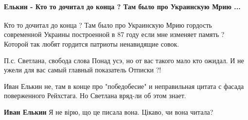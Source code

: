  
 
 
 
 
\paragraph{Елькин - Кто то дочитал до конца ? Там было про Украинскую Мрию ...}
\label{sec:14_07_2021.fb.krjukova_svetlana.1.statja_putina_mnenie.cmt.elkin_chtenie_konec}

\begin{itemize}
 

Кто то дочитал до конца ? Там было про Украинскую Мрию гордость современной
Украины построенной в 87 году если мне изменяет память ? Которой так любят
гордится патриоты ненавидящие совок. 

П.с. Светлана, свобода слова Понад усэ,
но от вас такого мало кто ожидал. И не ужели для вас самый главный показатель
Отписки ?!

 
Иван Елькин не, там в конце про "победобесие" и неправильная цитата с фасада поверженного Рейхстага. Но Светлана вряд-ли об этом знает.

 
\textbf{Иван Елькин} Я не вірю, що це писала вона. Цікаво, чи вона читала?

 

\end{itemize}
